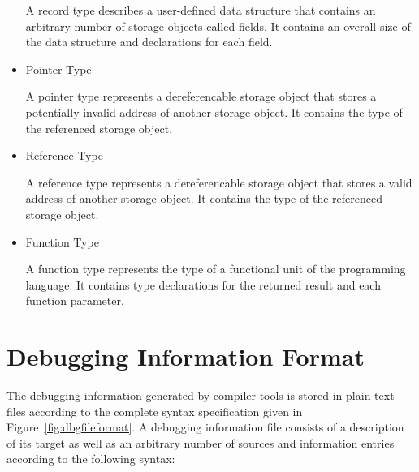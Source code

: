 \begin{itemize}
A record type describes a user-defined data structure that contains an arbitrary number of storage objects called fields.
It contains an overall size of the data structure and declarations for each field.

\item Pointer Type\alignright{}\nopagebreak

A pointer type represents a dereferencable storage object that stores a potentially invalid address of another storage object.
It contains the type of the referenced storage object.

\item Reference Type\alignright{}\nopagebreak

A reference type represents a dereferencable storage object that stores a valid address of another storage object.
It contains the type of the referenced storage object.

\item Function Type\alignright{}\nopagebreak

A function type represents the type of a functional unit of the programming language.
It contains type declarations for the returned result and each function parameter.

\end{itemize}

\section{Debugging Information Format}

The debugging information generated by compiler tools is stored in plain text files according to the complete syntax specification given in Figure~\ref{fig:dbgfileformat}.
A debugging information file consists of a description of its target as well as an arbitrary number of sources and information entries according to the following syntax:

